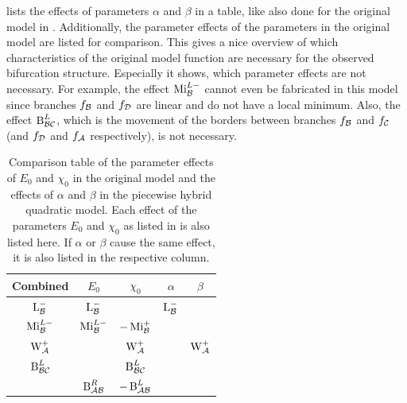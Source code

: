  lists the effects of parameters $\alpha$ and $\beta$ in a table, like also done for the original model in .
Additionally, the parameter effects of the parameters in the original model are listed for comparison.
This gives a nice overview of which characteristics of the original model function are necessary for the observed bifurcation structure.
Especially it shows, which parameter effects are not necessary.
For example, the effect $\operatorname{Mi}_{\mathcal{B}}^{L-}$ cannot even be fabricated in this model since branches $f_{\mathcal{B}}$ and $f_{\mathcal{D}}$ are linear and do not have a local minimum.
Also, the effect $\operatorname{B}_{\mathcal{B}\mathcal{C}}^L$, which is the movement of the borders between branches $f_{\mathcal{B}}$ and $f_{\mathcal{C}}$ (and $f_{\mathcal{D}}$ and $f_{\mathcal{A}}$ respectively), is not necessary.

\begin{table}
	\centering
	\begin{tabular}{|c||c|c||c|c|} \hline
		Combined         & $E_0$            & $\chi_0$          & $\alpha$     & $\beta$        \\ \hline \hline
		$\operatorname{L}_{\mathcal{B}}^{-}$   & $\operatorname{L}_{\mathcal{B}}^{-}$   &                   & $\operatorname{L}_{\mathcal{B}}^-$ &                \\ \hline
		$\operatorname{Mi}_{\mathcal{B}}^{L-}$ & $\operatorname{Mi}_{\mathcal{B}}^{L-}$ & $-\operatorname{Mi}_{\mathcal{B}}^{+}$  &              &                \\ \hline
		$\operatorname{W}_{\mathcal{A}}^{+}$   &                  & $\operatorname{W}_{\mathcal{A}}^{+}$    &              & $\operatorname{W}_{\mathcal{A}}^{+}$ \\ \hline \hline
		$\operatorname{B}_{\mathcal{B}\mathcal{C}}^{L}$ &                  & $\operatorname{B}_{\mathcal{B}\mathcal{C}}^{L}$  &              &                \\ \hline
		                 & $\operatorname{B}_{\mathcal{A}\mathcal{B}}^{R}$ & $-\operatorname{B}_{\mathcal{A}\mathcal{B}}^{L}$ &              &                \\ \hline
	\end{tabular}
	\caption[Comparison table of parameter effects in the piecewise hybrid quadratic model and the original model]{
		Comparison table of the parameter effects of $E_0$ and $\chi_0$ in the original model and the effects of $\alpha$ and $\beta$ in the piecewise hybrid quadratic model.
		Each effect of the parameters $E_0$ and $\chi_0$ as listed in  is also listed here.
		If $\alpha$ or $\beta$ cause the same effect, it is also listed in the respective column.
	}
	\label{table:setup.arch.paramfx}
\end{table}
